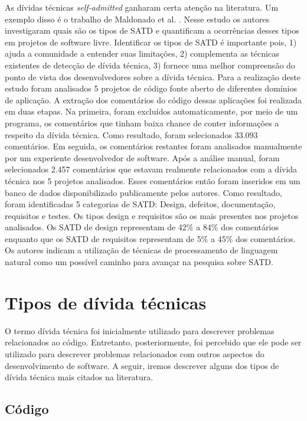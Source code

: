 As dívidas técnicas \textit{self-admitted} ganharam certa atenção na literatura. Um exemplo disso é o trabalho de Maldonado et al.  \cite{maldonado2015detecting}. Nesse estudo os autores  investigaram quais são os tipos de SATD e quantificam a ocorrências desses tipos em projetos de software livre. Identificar os tipos de SATD  é importante pois, 1) ajuda a comunidade a entender suas limitações, 2) complementa as técnicas existentes de detecção de dívida técnica, 3) fornece uma melhor compreensão do ponto de vista dos desenvolvedores sobre a dívida técnica. Para a realização deste estudo foram analisados 5 projetos de código fonte aberto de diferentes domínios de aplicação. A extração dos comentários do código dessas aplicações foi realizada em duas etapas. Na primeira, foram excluídos automaticamente, por meio de um programa, os comentários que tinham baixa chance de conter informações a respeito da dívida técnica. Como resultado, foram selecionados 33.093  comentários. Em seguida, os comentários restantes foram analisados manualmente por um experiente desenvolvedor de software.  Após a análise manual, foram selecionados 2.457 comentários que estavam realmente relacionados com a dívida técnica nos 5 projetos analisados. Esses comentários então foram inseridos em um banco de dados disponibilizado publicamente pelos autores. Como resultado, foram identificadas 5 categorias de SATD: Design, defeitos, documentação, requisitos e testes. Os tipos design e requisitos são os mais presentes nos projetos analisados. Os SATD de design representam de 42\% a 84\% dos comentários enquanto que os SATD de requisitos representam de 5\% a 45\% dos comentários. Os autores indicam a utilização de técnicas de processamento de linguagem natural como um possível caminho para avançar na pesquisa sobre SATD.

\section{Tipos de dívida técnicas}
\label{sec:tipos_td}

O termo dívida técnica foi inicialmente utilizado para descrever problemas relacionados ao código.  Entretanto, posteriormente, foi percebido que ele pode ser utilizado para descrever problemas relacionados com outros aspectos do desenvolvimento de software. A seguir, iremos descrever alguns dos tipos de dívida técnica mais citados na literatura.

\subsection{Código}

